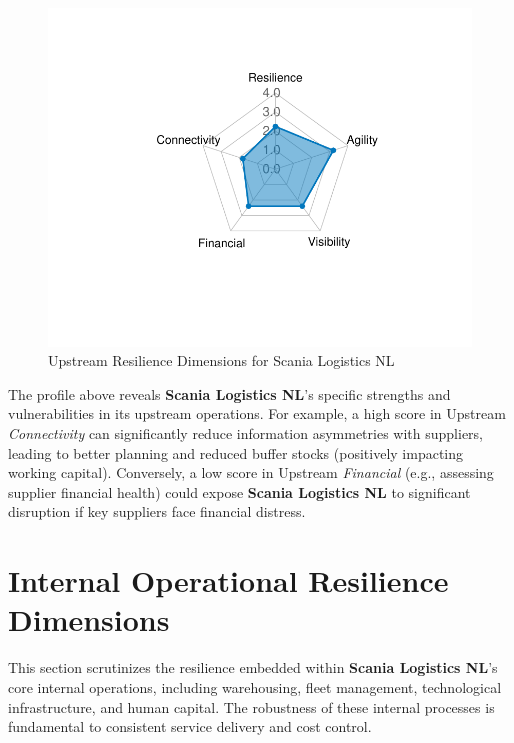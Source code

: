 \documentclass[
  oneside,
  open=any,
  fontsize=11pt]{scrbook}
\begin{document}
\begin{figure}[H]

{\centering \includegraphics[width=0.8\linewidth,height=\textheight,keepaspectratio]{example_3_files/figure-pdf/upstream-radar-chart-1.pdf}

}

\caption{Upstream Resilience Dimensions for Scania Logistics NL}

\end{figure}%

The profile above reveals \textbf{Scania Logistics NL}'s specific
strengths and vulnerabilities in its upstream operations. For example, a
high score in Upstream \emph{Connectivity} can significantly reduce
information asymmetries with suppliers, leading to better planning and
reduced buffer stocks (positively impacting working capital).
Conversely, a low score in Upstream \emph{Financial} (e.g., assessing
supplier financial health) could expose \textbf{Scania Logistics NL} to
significant disruption if key suppliers face financial distress.

\section{Internal Operational Resilience
Dimensions}\label{internal-operational-resilience-dimensions}

This section scrutinizes the resilience embedded within \textbf{Scania
Logistics NL}'s core internal operations, including warehousing, fleet
management, technological infrastructure, and human capital. The
robustness of these internal processes is fundamental to consistent
service delivery and cost control.
\end{document}
